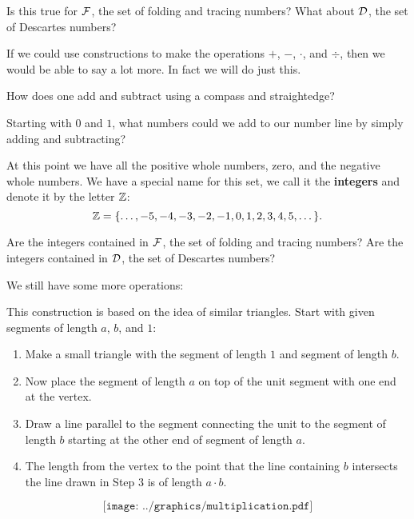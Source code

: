 \begin{question}
Is this true for $\mathcal F$, the set of folding and tracing numbers? What about
$\mathcal D$, the set of Descartes numbers?
\end{question}
\QM

If we could use constructions to make the operations $+$, $-$, $\cdot$, and $\div$, then we would be able to say a lot more.  In fact we will  do just this. 

\begin{question} 
How does one add and subtract using a compass and straightedge?
\end{question} 
\QM

\begin{question} 
Starting with $0$ and $1$, what numbers could we add to our number
line by simply adding and subtracting?
\end{question}

At this point we have all the positive whole numbers, zero, and the
negative whole numbers. We have a special name for this set, we call
it the \textbf{integers} and denote it by the letter
$\mathbb Z$:
\[
\Z = \{\dots, -5, -4, -3, -2, -1, 0, 1,2,3,4,5,\dots \}. \index{Z@$\Z$}
\]
\begin{question}
Are the integers contained in $\mathcal F$, the set of folding and tracing numbers? Are
the integers contained in $\mathcal D$, the set of Descartes numbers?
\end{question}
\QM

We still have some more operations:

\begin{construction}[Multiplication] 
This construction is based on the idea of similar triangles. Start
with given segments of length $a$, $b$, and $1$:
\begin{enumerate}
 \item Make a small triangle with the segment  of length $1$ and segment of length $b$.
 \item Now place the segment of length $a$ on top of the unit segment  with one end at the vertex.
 \item Draw a line parallel to the segment connecting the unit to the segment of length $b$ starting at the other end of segment of length $a$.
 \item The length from the vertex to the point that the line containing $b$ intersects the line drawn in Step $3$ is of length $a\cdot b$.
\end{enumerate}
\[
\texttt{[image: ../graphics/multiplication.pdf]}
\]
\end{construction}
 

